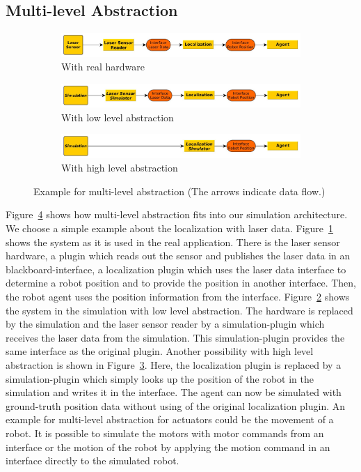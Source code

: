 \subsection{Multi-level Abstraction}
\label{sec:architecture_mla}
\begin{figure}
\centering
\begin{subfigure}[b]{\textwidth}
\includegraphics[width=\textwidth]{tabs/mla_hardware}
\caption{With real hardware}
\label{fig:mla_hardware}
\end{subfigure}
\begin{subfigure}[b]{\textwidth}
\includegraphics[width=\textwidth]{tabs/mla_sim_low}
\caption{With low level abstraction}
\label{fig:mla_sim_low}
\end{subfigure}
\begin{subfigure}[b]{\textwidth}
\includegraphics[width=\textwidth]{tabs/mla_sim_high}
\caption{With high level abstraction}
\label{fig:mla_sim_high}
\end{subfigure}
\caption{Example for multi-level abstraction (The arrows indicate data flow.)}
\label{fig:mla}
\end{figure}
Figure~\ref{fig:mla} shows how multi-level abstraction fits into our simulation architecture. We choose a simple example about the localization with laser data. Figure~\ref{fig:mla_hardware} shows the system as it is used in the real application. There is the laser sensor hardware, a plugin which reads out the sensor and publishes the laser data in an blackboard-interface, a localization plugin which uses the laser data interface to determine a robot position and to provide the position in another interface. Then, the robot agent uses the position information from the interface. Figure~\ref{fig:mla_sim_low} shows the system in the simulation with low level abstraction. The hardware is replaced by the simulation and the laser sensor reader by a simulation-plugin which receives the laser data from the simulation. This simulation-plugin provides the same interface as the original plugin. Another possibility with high level abstraction is shown in Figure~\ref{fig:mla_sim_high}. Here, the localization plugin is replaced by a simulation-plugin which simply looks up the position of the robot in the simulation and writes it in the interface. The agent can now be simulated with ground-truth position data without using of the original localization plugin. An example for multi-level abstraction for actuators could be the movement of a robot. It is possible to simulate the motors with motor commands from an interface or the motion of the robot by applying the motion command in an interface directly to the simulated robot.
